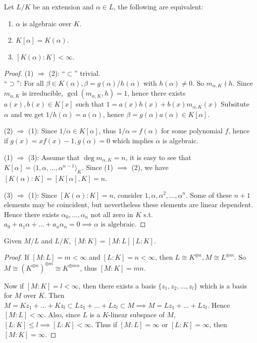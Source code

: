\begin{prop}
  Let $L/K$ be an extension and $\alpha \in L$, the following are equivalent:
  \begin{enumerate}[(\arabic*)]
    \item $\alpha$ is algebraic over $K$.
    \item $K[\alpha] = K(\alpha)$.
    \item $[K(\alpha): K] < \infty$.
  \end{enumerate}

  \begin{proof}
    (1) $\Rightarrow$ (2): ``$\subset$'' trivial. \\
    ``$\supset$'': For all $\beta \in K(\alpha), \beta = g(\alpha) / h(\alpha)$ with $h(\alpha) \neq 0$.
    So $m_{\alpha, K} \nmid h$. Since $m_{\alpha, K}$ is irreducible, $\gcd(m_{\alpha, K}, h) = 1$,
    hence there exists $a(x), b(x) \in K[x]$ such that $1 = a(x) h(x) + b(x) m_{\alpha, K}(x)$
    Subsitute $\alpha$ and we get $1/h(\alpha) = a(\alpha)$, hence $\beta = g(\alpha) a(\alpha) \in K[\alpha]$.

    (2) $\Rightarrow$ (1): Since $1 / \alpha \in K[\alpha]$, thus $1 / \alpha = f(\alpha)$ for some
    polynomial $f$, hence if $g(x) = xf(x) - 1, g(\alpha) = 0$ which implies $\alpha$ is algebraic.

    (1) $\Rightarrow$ (3): Assume that $\deg m_{\alpha, K} = n$, it is easy to see that
    $K[\alpha] = \langle 1, \alpha, \dots, \alpha^{n-1} \rangle_K$. Since (1) $\implies$ (2),
    we have $[K(\alpha): K] = [K[\alpha], K] = n$.

    (3) $\Rightarrow$ (1): Since $[K(\alpha): K] = n$, consider $1, \alpha, \alpha^2, \dots, \alpha^n$.
    Some of these $n+1$ elements may be coincident, but nevertheless these elements are linear dependent.
    Hence there exists $\alpha_0, \dots, \alpha_n$ not all zero in $K$ s.t.
    $a_0 + a_1 \alpha + \dots + a_n \alpha_n = 0 \implies \alpha \text{ is algebraic.}$
  \end{proof}
\end{prop}

\begin{prop}
  Given $M/L$ and $L/K$, $[M: K] = [M: L] [L: K]$.

  \begin{proof}
    If $[M:L] = m < \infty$ and $[L:K] = n < \infty$, then $L \cong K^{\oplus n}, M \cong L^{\oplus m}$.
    So $M \cong \left( K^{\oplus n} \right)^{\oplus m} \cong K^{\oplus mn}$, thus $[M: K] = mn$.

    Now if $[M: K] = l < \infty$, then there exists a basis $\{ z_1, z_2, \dots, z_l \}$
    which is a basis for $M$ over $K$. Then $M = K z_1 + \dots + K z_l \subset L z_1 +
    \dots + L z_l \subset M \implies M = L z_1 + \dots + L z_l$. Hence $[M: L] < \infty$.
    Also, since $L$ is a $K$-linear subspace of $M$, $[L: K] \leq l \implies [L: K] < \infty$.
    Thus if $[M: L] = \infty$ or $[L: K] = \infty$, then $[M: K] = \infty$.
  \end{proof}
\end{prop}

